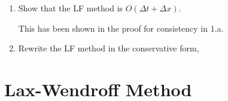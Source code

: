 \documentclass{article}
\begin{document}
\begin{enumerate}[label = (\alph*)]
\begin{gather*}
{            t}{2\Delta x}\left(U_{j+1}^n - U_{j-1}^n\right)\right)\\
            = \lim_{\Delta t, \Delta x \to 0} U_{t, j}^n + 
            \frac{\Delta t}{2}U_{tt, j}^n + O(\Delta t^2) 
            + \frac{\Delta x^2}{2\Delta t}U_{xx, j}^n + O(\Delta x^3) +
            U_{x, j}^n + \frac{\Delta x^2}{6}U_{xxx,j}^n\\
            = \lim_{\Delta t, \Delta x \to 0}\frac{\Delta t}{2}U_{tt, j}^n+ 
            \frac{\Delta x}{2a}U_{xx, j}^n + O(\Delta^2)
        \end{gather*}
        Therefore, we have shown that the local truncation error is bounded by
        $\Delta t + \Delta x$ with order 1. 

    \textbf{Stability}
    Next to show stability we look at the von Neumann stability analysis. We
    have, 
    \begin{gather*}
        G = \frac{1}{2}\left(e^{ik_x\Delta x} + e^{-ik+x\Delta x}\right) -
        \frac{C_a}{2}\left(e^{ik_x\Delta x} - e^{-ik+x\Delta x}\right)\\
        = \cos(k_x\Delta x) - iC_a\sin(k_x\Delta x)\\
        |G| = \cos^2(k_x\Delta x) + C_a^2\sin^2(k_x\Delta x)\\
        = \cos^2(k_x\Delta x) + \sin^2(k_x\Delta x) + (C_a^2 -1)\sin^2(k_x\Delta
        x) = 1 - (1 - C_a^2)\sin^2(k_x\Delta
        x) \le 1
    \end{gather*}
    Where here, since $|C_a| \le 1$  we must have that $C_a^2 \le 1$ and the
    right most term is negative semi-definite, thereby bounding $|G|$ to ensure
    stability. 

    \item Show that the LF method is $O(\Delta t + \Delta x)$. 

    This has been shown in the proof for consistency in 1.a.

    \item Rewrite the LF method in the conservative form, 


\end{enumerate}

\section{Lax-Wendroff Method}
\end{document}
